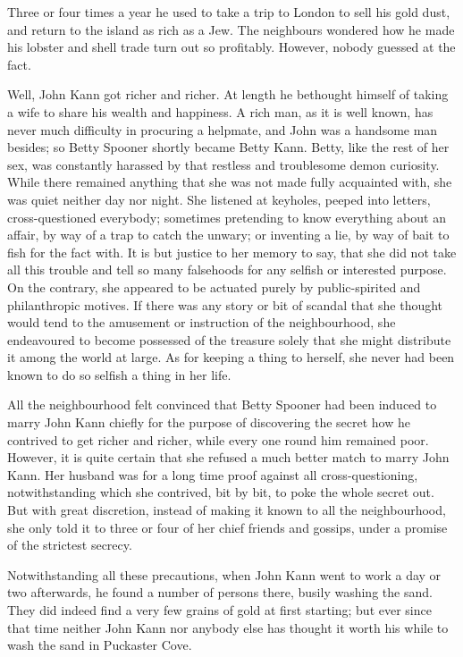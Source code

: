 \documentclass[
  12pt,
  a5paper,
  twoside]{book}
\begin{document}
Three or four times a year he used to take a trip to London to sell his
gold dust, and return to the island as rich as a Jew. The neighbours
wondered how he made his lobster and shell trade turn out so profitably.
However, nobody guessed at the fact.

Well, John Kann got richer and richer. At length he bethought himself of
taking a wife to share his wealth and happiness. A rich man, as it is
well known, has never much difficulty in procuring a helpmate, and John
was a handsome man besides; so Betty Spooner shortly became Betty Kann.
Betty, like the rest of her sex, was constantly harassed by that
restless and troublesome demon curiosity. While there remained anything
that she was not made fully acquainted with, she was quiet neither day
nor night. She listened at keyholes, peeped into letters,
cross-questioned everybody; sometimes pretending to know everything
about an affair, by way of a trap to catch the unwary; or inventing a
lie, by way of bait to fish for the fact with. It is but justice to her
memory to say, that she did not take all this trouble and tell so many
falsehoods for any selfish or interested purpose. On the contrary, she
appeared to be actuated purely by public-spirited and philanthropic
motives. If there was any story or bit of scandal that she thought would
tend to the amusement or instruction of the neighbourhood, she
endeavoured to become possessed of the treasure solely that she might
distribute it among the world at large. As for keeping a thing to
herself, she never had been known to do so selfish a thing in her life.

All the neighbourhood felt convinced that Betty Spooner had been induced
to marry John Kann chiefly for the purpose of discovering the secret how
he contrived to get richer and richer, while every one round him
remained poor. However, it is quite certain that she refused a much
better match to marry John Kann. Her husband was for a long time proof
against all cross-questioning, notwithstanding which she contrived, bit
by bit, to poke the whole secret out. But with great discretion, instead
of making it known to all the neighbourhood, she only told it to three
or four of her chief friends and gossips, under a promise of the
strictest secrecy.

Notwithstanding all these precautions, when John Kann went to work a day
or two afterwards, he found a number of persons there, busily washing
the sand. They did indeed find a very few grains of gold at first
starting; but ever since that time neither John Kann nor anybody else
has thought it worth his while to wash the sand in Puckaster Cove.
\end{document}
